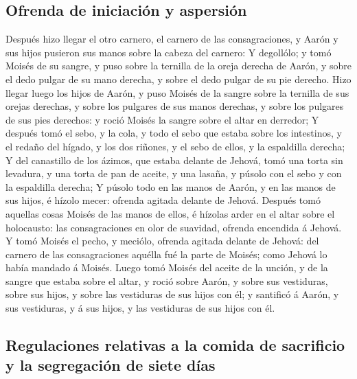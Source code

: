 \hypertarget{ofrenda-de-iniciaciuxf3n-y-aspersiuxf3n}{%
\subsection{Ofrenda de iniciación y
aspersión}\label{ofrenda-de-iniciaciuxf3n-y-aspersiuxf3n}}

 Después hizo llegar el otro carnero, el carnero de las
consagraciones, y Aarón y sus hijos pusieron sus manos sobre la cabeza
del carnero:  Y degollólo; y tomó Moisés de su sangre, y
puso sobre la ternilla de la oreja derecha de Aarón, y sobre el dedo
pulgar de su mano derecha, y sobre el dedo pulgar de su pie derecho.
 Hizo llegar luego los hijos de Aarón, y puso Moisés de la
sangre sobre la ternilla de sus orejas derechas, y sobre los pulgares de
sus manos derechas, y sobre los pulgares de sus pies derechos: y roció
Moisés la sangre sobre el altar en derredor;  Y después
tomó el sebo, y la cola, y todo el sebo que estaba sobre los intestinos,
y el redaño del hígado, y los dos riñones, y el sebo de ellos, y la
espaldilla derecha;  Y del canastillo de los ázimos, que
estaba delante de Jehová, tomó una torta sin levadura, y una torta de
pan de aceite, y una lasaña, y púsolo con el sebo y con la espaldilla
derecha;  Y púsolo todo en las manos de Aarón, y en las
manos de sus hijos, é hízolo mecer: ofrenda agitada delante de Jehová.
 Después tomó aquellas cosas Moisés de las manos de ellos,
é hízolas arder en el altar sobre el holocausto: las consagraciones en
olor de suavidad, ofrenda encendida á Jehová.  Y tomó
Moisés el pecho, y meciólo, ofrenda agitada delante de Jehová: del
carnero de las consagraciones aquélla fué la parte de Moisés; como
Jehová lo había mandado á Moisés.  Luego tomó Moisés del
aceite de la unción, y de la sangre que estaba sobre el altar, y roció
sobre Aarón, y sobre sus vestiduras, sobre sus hijos, y sobre las
vestiduras de sus hijos con él; y santificó á Aarón, y sus vestiduras, y
á sus hijos, y las vestiduras de sus hijos con él.

\hypertarget{regulaciones-relativas-a-la-comida-de-sacrificio-y-la-segregaciuxf3n-de-siete-duxedas}{%
\subsection{Regulaciones relativas a la comida de sacrificio y la
segregación de siete
días}\label{regulaciones-relativas-a-la-comida-de-sacrificio-y-la-segregaciuxf3n-de-siete-duxedas}}

